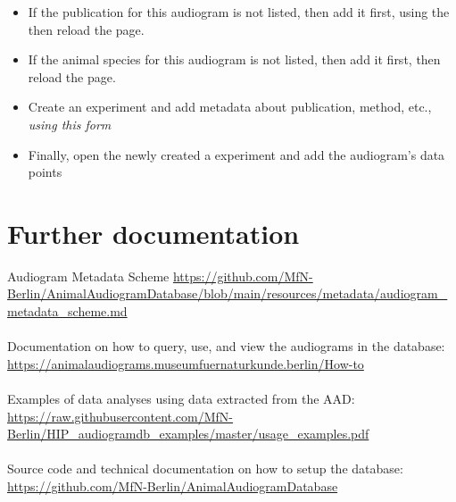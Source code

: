 \documentclass{article}
\begin{document}
\begin{itemize}
\item{If the publication for this audiogram is not listed, then add it first, using the then reload the page.}
\item{If the animal species for this audiogram is not listed, then add it first, then reload the page.}
\item{Create an experiment and add metadata about publication, method, etc., \emph{using this form}}
\item{Finally, open the newly created a experiment and add the audiogram's data points}
\end{itemize}

\section{Further documentation}
Audiogram Metadata Scheme
\url{https://github.com/MfN-Berlin/AnimalAudiogramDatabase/blob/main/resources/metadata/audiogram_metadata_scheme.md}
\\\\
Documentation on how to query, use, and view the audiograms in the database:
\url{https://animalaudiograms.museumfuernaturkunde.berlin/How-to}
\\\\
Examples of data analyses using data extracted from the AAD:
\url{https://raw.githubusercontent.com/MfN-Berlin/HIP_audiogramdb_examples/master/usage_examples.pdf}
\\\\
Source code and technical documentation on how to setup the database: \url{https://github.com/MfN-Berlin/AnimalAudiogramDatabase}
\end{document}
